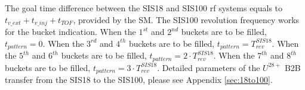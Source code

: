 The goal time difference between the SIS18 and SIS100 rf systems equals to $t_{v\_ext}+t_{v\_inj}+t_{TOF}$, provided by the SM. The SIS100 revolution frequency works for the bucket indication. When the $1^{st}$ and $2^{nd}$ buckets are to be filled, $t_{pattern}=0$. When the $3^{rd}$ and $4^{th}$ buckets are to be filled, $t_{pattern}=T_{\mathit{rev}}^{\mathit{SIS18}}$. When the $5^{th}$ and $6^{th}$ buckets are to be filled, $t_{pattern}= 2 \cdot T_{\mathit{rev}}^{\mathit{SIS18}}$. When the $7^{th}$ and $8^{th}$ buckets are to be filled, $t_{pattern}= 3 \cdot T_{\mathit{rev}}^{\mathit{SIS18}}$. Detailed parameters of the $U^{28+}$ B2B transfer from the SIS18 to the SIS100, please see Appendix \ref{sec:18to100}.

%
%
%
